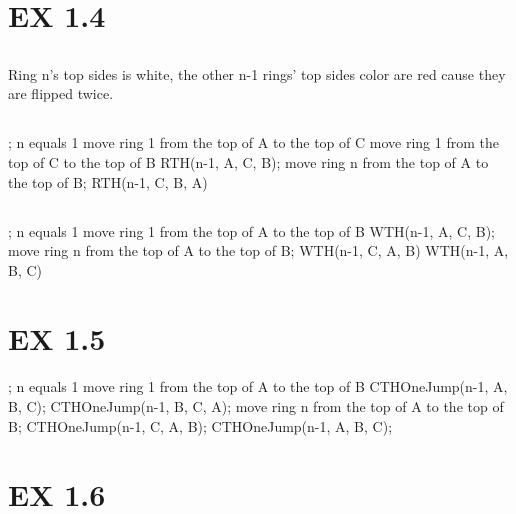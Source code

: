 \section{EX 1.4}

\subsection{}
Ring n's top sides is white, the other n-1 rings' top sides color are red cause they are flipped twice.

\subsection{}
\Prog\qq     %
; \qq 
\If n equals 1 \Then\qq
move ring 1 from the top of A to the top of C\qq
move ring 1 from the top of C to the top of B\qq
\Else\qq
RTH(n-1, A, C, B);\qq
move ring n from the top of A to the top of B;\qq
RTH(n-1, C, B, A)\qq
\Endif\qq
\Fini 

\subsection{}
\Prog\qq     %
; \qq 
\If n equals 1 \Then\qq
move ring 1 from the top of A to the top of B\qq
\Else\qq
WTH(n-1, A, C, B);\qq
move ring n from the top of A to the top of B;\qq
WTH(n-1, C, A, B)\qq
WTH(n-1, A, B, C)\qq
\Endif\qq
\Fini


\section{EX 1.5}
\Prog\qq     %
; \qq 
\If n equals 1 \Then\qq
move ring 1 from the top of A to the top of B\qq
\Else\qq
CTHOneJump(n-1, A, B, C);\qq
CTHOneJump(n-1, B, C, A);\qq
move ring n from the top of A to the top of B;\qq
CTHOneJump(n-1, C, A, B);\qq
CTHOneJump(n-1, A, B, C);\qq
\Endif\qq
\Fini

\section{EX 1.6}
